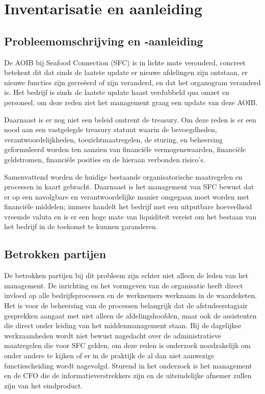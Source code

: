 \documentclass[10pt,a4paper,twoside]{report}
\begin{document}
\chapter{Inventarisatie en aanleiding}
\section{Probleemomschrijving en -aanleiding}
De AOIB bij Seafood Connection (SFC) is in lichte mate verouderd, concreet betekent dit dat sinds de laatste update er nieuwe afdelingen zijn ontstaan, er nieuwe functies zijn gecreëerd of zijn veranderd, en dat het organogram veranderd is. Het bedrijf is sinds de laatste update haast verdubbeld qua omzet en personeel, om deze reden ziet het management graag een update van deze AOIB. 

Daarnaast is er nog niet een beleid omtrent de treasury. Om deze reden is er een nood aan een vastgelegde treasury statuut waarin de bevoegdheden, verantwoordelijkheden, toezichtmaatregelen, de sturing, en beheersing geformuleerd worden ten aanzien van financiële vermogenswaarden, financiële geldstromen, financiële posities en de hieraan verbonden risico’s. \citep{ede,handreiking}

Samenvattend worden de huidige bestaande organisatorische maatregelen en processen in kaart gebracht. Daarnaast is het management van SFC bewust dat er op een navolgbare en verantwoordelijke manier omgegaan moet worden met financiële middelen; immers handelt het bedrijf met een uitputbare hoeveelheid vreemde valuta en is er een hoge mate van liquiditeit vereist om het bestaan van het bedrijf in de toekomst te kunnen garanderen.

\section{Betrokken partijen}
De betrokken partijen bij dit probleem zijn echter niet alleen de leden van het management. De inrichting en het vormgeven van de organisatie heeft direct invloed op alle bedrijfsprocessen en de werknemers werkzaam in de waardeketen. Het is voor de beheersing van de processen belangrijk dat de afstudeerstagiair gesprekken aangaat met niet alleen de afdelingshoofden, maar ook de assistenten die direct onder leiding van het middenmanagement staan. Bij de dagelijkse werkzaamheden wordt niet bewust nagedacht over de administratieve maatregelen die voor SFC gelden, om deze reden is onderzoek noodzakelijk om onder andere te kijken of er in de praktijk de al dan niet aanwezige functiescheiding wordt nagevolgd. Sturend in het onderzoek is het management en de CFO die de informatieverstrekkers zijn en de uiteindelijke afnemer zullen zijn van het eindproduct. 
\end{document}
